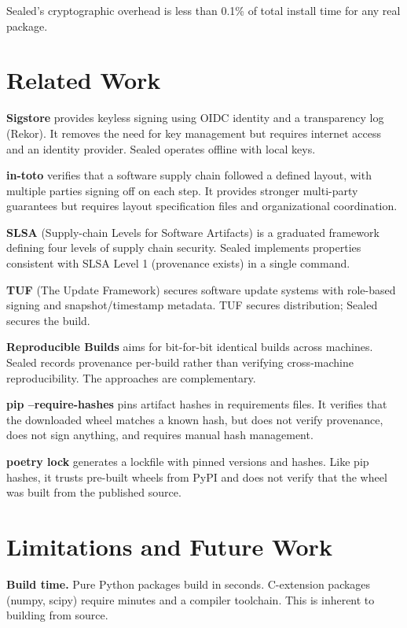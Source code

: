 \documentclass[11pt,a4paper]{article}
\begin{document}
Sealed's cryptographic overhead is less than 0.1\% of total install time for any real package.

\section{Related Work}

\textbf{Sigstore} \cite{sigstore} provides keyless signing using OIDC identity and a transparency log (Rekor). It removes the need for key management but requires internet access and an identity provider. Sealed operates offline with local keys.

\textbf{in-toto} \cite{intoto} verifies that a software supply chain followed a defined layout, with multiple parties signing off on each step. It provides stronger multi-party guarantees but requires layout specification files and organizational coordination.

\textbf{SLSA} \cite{slsa} (Supply-chain Levels for Software Artifacts) is a graduated framework defining four levels of supply chain security. Sealed implements properties consistent with SLSA Level 1 (provenance exists) in a single command.

\textbf{TUF} \cite{tuf} (The Update Framework) secures software update systems with role-based signing and snapshot/timestamp metadata. TUF secures distribution; Sealed secures the build.

\textbf{Reproducible Builds} \cite{reproducible} aims for bit-for-bit identical builds across machines. Sealed records provenance per-build rather than verifying cross-machine reproducibility. The approaches are complementary.

\textbf{pip --require-hashes} pins artifact hashes in requirements files. It verifies that the downloaded wheel matches a known hash, but does not verify provenance, does not sign anything, and requires manual hash management.

\textbf{poetry lock} generates a lockfile with pinned versions and hashes. Like pip hashes, it trusts pre-built wheels from PyPI and does not verify that the wheel was built from the published source.

\section{Limitations and Future Work}

\textbf{Build time.} Pure Python packages build in seconds. C-extension packages (numpy, scipy) require minutes and a compiler toolchain. This is inherent to building from source.
\end{document}
